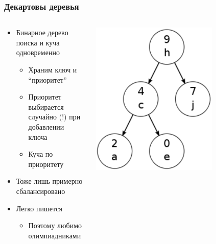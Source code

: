 \documentclass[xetex,mathserif,serif]{beamer}
\begin{document}
	\begin{frame}
		\frametitle{Декартовы деревья}
		\begin{columns}
			\begin{column}{0.6\textwidth}
				\begin{itemize}
					\item Бинарное дерево поиска и куча одновременно
					\begin{itemize}
						\item Храним ключ и ``приоритет''
						\item Приоритет выбирается случайно (!) при добавлении ключа
						\item Куча по приоритету
					\end{itemize}
					\item Тоже лишь примерно сбалансировано
					\item Легко пишется
					\begin{itemize}
						\item Поэтому любимо олимпиадниками
					\end{itemize}
				\end{itemize}
			\end{column}
			\begin{column}{0.4\textwidth}
				\includegraphics[width=0.7\textwidth]{treap.png}
			\end{column}
		\end{columns}
	\end{frame}
\end{document}
